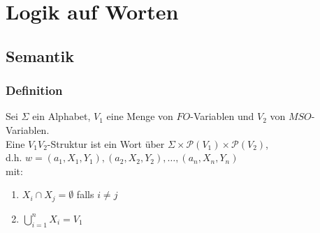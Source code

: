 \section{Logik auf Worten}
    \subsection{Semantik}
        \subsubsection{Definition}
            Sei $\Sigma$ ein Alphabet, $V_1$ eine Menge von $FO$-Variablen und $V_2$ von $MSO$-Variablen.\\
            Eine $V_1V_2$-Struktur ist ein Wort über $\Sigma\times\mathcal{P}\left(V_1\right)\times\mathcal{P}\left(V_2\right)$,\\ d.h. $w=\left(a_1,X_1,Y_1\right),\left(a_2,X_2,Y_2\right),\dots,\left(a_n,X_n,Y_n\right)$\\
            mit:\begin{enumerate}
                \item $X_i\cap X_j=\emptyset$ falls $i\not=j$
                \item $\bigcup\limits_{i=1}^nX_i=V_1$
            \end{enumerate}
